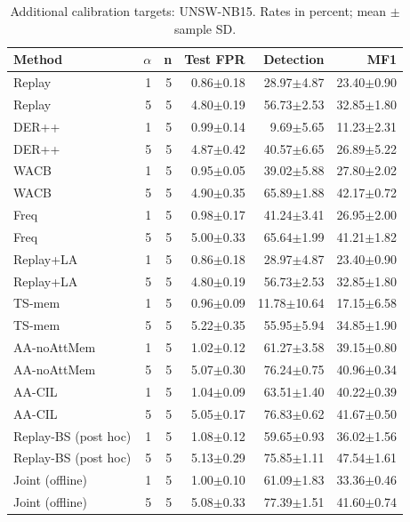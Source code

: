 \begin{table}[t]
\centering\scriptsize
\setlength{\tabcolsep}{3.8pt}
\caption{Additional calibration targets: UNSW-NB15. Rates in percent; mean $\pm$ sample SD.}\label{tab:alpha-unsw}
\begin{tabular}{lrrrrr}
\toprule
Method & $\alpha$ & n & Test FPR & Detection & MF1 \\
\midrule
Replay & 1 & 5 & 0.86$\pm$0.18 & 28.97$\pm$4.87 & 23.40$\pm$0.90 \\
Replay & 5 & 5 & 4.80$\pm$0.19 & 56.73$\pm$2.53 & 32.85$\pm$1.80 \\
DER++ & 1 & 5 & 0.99$\pm$0.14 & 9.69$\pm$5.65 & 11.23$\pm$2.31 \\
DER++ & 5 & 5 & 4.87$\pm$0.42 & 40.57$\pm$6.65 & 26.89$\pm$5.22 \\
WACB & 1 & 5 & 0.95$\pm$0.05 & 39.02$\pm$5.88 & 27.80$\pm$2.02 \\
WACB & 5 & 5 & 4.90$\pm$0.35 & 65.89$\pm$1.88 & 42.17$\pm$0.72 \\
Freq & 1 & 5 & 0.98$\pm$0.17 & 41.24$\pm$3.41 & 26.95$\pm$2.00 \\
Freq & 5 & 5 & 5.00$\pm$0.33 & 65.64$\pm$1.99 & 41.21$\pm$1.82 \\
Replay+LA & 1 & 5 & 0.86$\pm$0.18 & 28.97$\pm$4.87 & 23.40$\pm$0.90 \\
Replay+LA & 5 & 5 & 4.80$\pm$0.19 & 56.73$\pm$2.53 & 32.85$\pm$1.80 \\
TS-mem & 1 & 5 & 0.96$\pm$0.09 & 11.78$\pm$10.64 & 17.15$\pm$6.58 \\
TS-mem & 5 & 5 & 5.22$\pm$0.35 & 55.95$\pm$5.94 & 34.85$\pm$1.90 \\
AA-noAttMem & 1 & 5 & 1.02$\pm$0.12 & 61.27$\pm$3.58 & 39.15$\pm$0.80 \\
AA-noAttMem & 5 & 5 & 5.07$\pm$0.30 & 76.24$\pm$0.75 & 40.96$\pm$0.34 \\
AA-CIL & 1 & 5 & 1.04$\pm$0.09 & 63.51$\pm$1.40 & 40.22$\pm$0.39 \\
AA-CIL & 5 & 5 & 5.05$\pm$0.17 & 76.83$\pm$0.62 & 41.67$\pm$0.50 \\
Replay-BS (post hoc) & 1 & 5 & 1.08$\pm$0.12 & 59.65$\pm$0.93 & 36.02$\pm$1.56 \\
Replay-BS (post hoc) & 5 & 5 & 5.13$\pm$0.29 & 75.85$\pm$1.11 & 47.54$\pm$1.61 \\
Joint (offline) & 1 & 5 & 1.00$\pm$0.10 & 61.09$\pm$1.83 & 33.36$\pm$0.46 \\
Joint (offline) & 5 & 5 & 5.08$\pm$0.33 & 77.39$\pm$1.51 & 41.60$\pm$0.74 \\
\bottomrule
\end{tabular}
\end{table}
